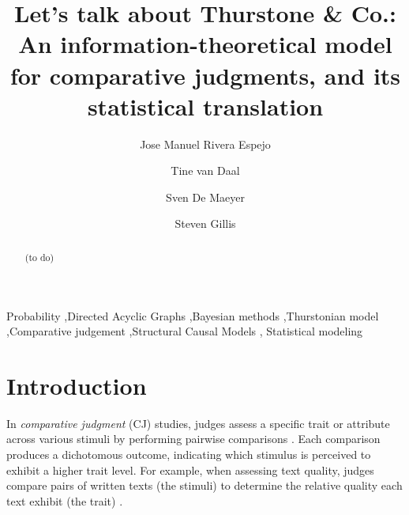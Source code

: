 \documentclass[
  authoryear,
  preprint,
  1p]{elsarticle}
\begin{document}
\begin{frontmatter}
\title{Let's talk about Thurstone \& Co.: An information-theoretical
model for comparative judgments, and its statistical translation}
\author[1]{Jose Manuel Rivera Espejo%
%
}
\author[1]{Tine van Daal%
%
}
\author[1]{Sven De Maeyer%
%
}
\author[2]{Steven Gillis%
%
}






        
\begin{abstract}
(to do)
\end{abstract}





\begin{keyword}
    Probability \sep Directed Acyclic Graphs \sep Bayesian
methods \sep Thurstonian model \sep Comparative
judgement \sep Structural Causal Models \sep 
    Statistical modeling
\end{keyword}
\end{frontmatter}
    

\section{Introduction}\label{sec-introduction}

In \emph{comparative judgment} (CJ) studies, judges assess a specific
trait or attribute across various stimuli by performing pairwise
comparisons \citep{Thurstone_1927a, Thurstone_1927b}. Each comparison
produces a dichotomous outcome, indicating which stimulus is perceived
to exhibit a higher trait level. For example, when assessing text
quality, judges compare pairs of written texts (the stimuli) to
determine the relative quality each text exhibit (the trait)
\citep{Laming_2004, Pollitt_2012b, Whitehouse_2012, vanDaal_et_al_2016, Lesterhuis_2018_thesis, Coertjens_et_al_2017, Goossens_et_al_2018, Bouwer_et_al_2023}.
\end{document}
